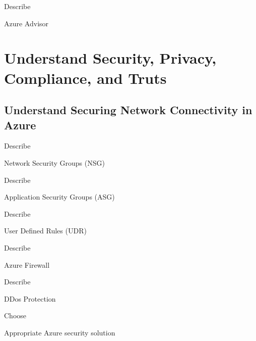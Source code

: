 \documentclass{scrartcl}
\newenvironment{flashcard}[2][]{%
    #1
    \vfill
    \centerline{\Large{#2}}
    \vfill
    \newpage
}
{\newpage}
\newcommand{\sectioncard}[1]{
    \vspace*{\stretch{1}}
    \section{#1}
    \vspace*{\stretch{1}}
    \pagebreak
}
\newcommand{\subsectioncard}[1]{
    \vspace*{\stretch{1}}
    \subsection{#1}
    \vspace*{\stretch{1}}
    \pagebreak
}
\begin{document}
    \begin{flashcard}[Describe]{Azure Advisor}

    \end{flashcard}

    \sectioncard{Understand Security, Privacy, Compliance, and Truts}

    \subsectioncard{Understand Securing Network Connectivity in Azure}

    \begin{flashcard}[Describe]{Network Security Groups (NSG)}

    \end{flashcard}

    \begin{flashcard}[Describe]{Application Security Groups (ASG)}

    \end{flashcard}

    \begin{flashcard}[Describe]{User Defined Rules (UDR)}

    \end{flashcard}

    \begin{flashcard}[Describe]{Azure Firewall}

    \end{flashcard}

    \begin{flashcard}[Describe]{DDos Protection}

    \end{flashcard}

    \begin{flashcard}[Choose]{Appropriate Azure security solution}

    \end{flashcard}
\end{document}
